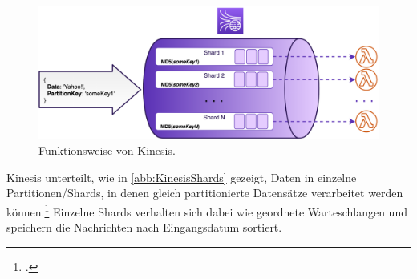 \begin{figure}[H]
\centering
\includegraphics[width=\textwidth]{graphics/kinesis-inner-workings.png}
\caption[Funktionsweise von Kinesis]{Funktionsweise von Kinesis.\footnotemark}
\label{abb:KinesisShards}
\end{figure}
Kinesis unterteilt, wie in \autoref{abb:KinesisShards} gezeigt, Daten in einzelne Partitionen/Shards, in denen gleich partitionierte Datensätze verarbeitet werden können.\footcite[Vgl. auch im Folgenden][]{Pogosova.28.05.2020} Einzelne Shards verhalten sich dabei wie geordnete Warteschlangen und speichern die Nachrichten nach Eingangsdatum sortiert. 


